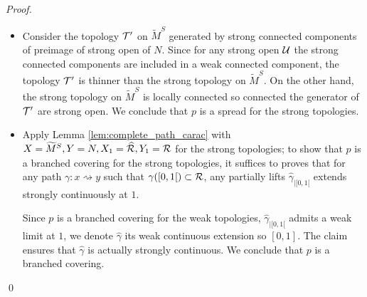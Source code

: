 \begin{proof}
\begin{itemize}
 \item Consider the topology $\mathcal{T}'$ on $\widetilde M^S$ generated by strong connected components of preimage of strong open of $N$. 
 Since  for any strong open $\mathcal{U}$ the strong connected components are included in a weak connected component, the topology $\mathcal{T}'$ is thinner than the strong topology on $\widetilde M^S$. On the other hand, the strong topology on $\widetilde M^S$ is locally connected so connected the generator of $\mathcal{T}'$ are strong open.  We conclude that $p$ is a spread for the strong topologies.
 
 \item Apply Lemma \ref{lem:complete_path_carac} with $X=\widetilde M^S,Y=N, X_1=\widehat {\mathcal R},Y_1=\mathcal R$ for the strong topologies; to show that $p$ is a branched covering for the strong topologies, it suffices to proves that for any path $\gamma : x\rightsquigarrow y$ such that $\gamma([0,1[)\subset \mathcal R$, any partially lifts  $\hat \gamma_{|[0,1[}$ extends strongly continuously at $1$. 
 
 Since $p$ is a branched covering for the weak topologies, $\hat \gamma_{|[0,1[}$ admits a weak limit at $1$, we denote $\hat \gamma$ its weak continuous extension so $[0,1]$. The claim ensures that $\hat \gamma$ is actually strongly continuous. We conclude that $p$ is a branched covering.
 
 \end{itemize}
\qed\end{proof}







